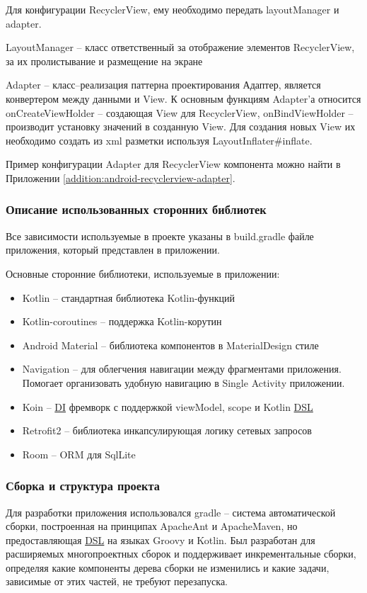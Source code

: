 Для конфигурации RecyclerView, ему необходимо передать layoutManager и adapter.

LayoutManager – класс ответственный за отображение элементов RecyclerView, за их пролистывание и размещение на экране

Adapter – класс–реализация паттерна проектирования Адаптер, является конвертером между данными и View.
К основным функциям Adapter’а относится onCreateViewHolder – создающая View для RecyclerView, onBindViewHolder – производит установку значений в созданную View.
Для создания новых View их необходимо создать из xml разметки используя LayoutInflater\#inflate.

Пример конфигурации Adapter для RecyclerView компонента можно найти в Приложении \ref{addition:android-recyclerview-adapter}.

\subsubsection{Описание использованных сторонних библиотек}\indent
Все зависимости используемые в проекте указаны в build.gradle файле приложения, который представлен в приложении.

Основные сторонние библиотеки, используемые в приложении:


\begin{itemize}
    \item Kotlin – стандартная библиотека Kotlin-функций
    \item Kotlin-coroutines – поддержка Kotlin-корутин
    \item Android Material – библиотека компонентов в MaterialDesign стиле
    \item Navigation – для облегчения навигации между фрагментами приложения. Помогает организовать удобную навигацию в Single Activity приложении.
    \item Koin – \hyperlink{gloss:di}{DI} фремворк с поддержкой viewModel, scope и Kotlin \hyperlink{gloss:dsl}{DSL}
    \item Retrofit2 – библиотека инкапсулирующая логику сетевых запросов
    \item Room – ORM для SqlLite
\end{itemize}

\subsubsection{Сборка и структура проекта}\indent
Для разработки приложения использовался gradle – система автоматической сборки, построенная на принципах ApacheAnt и ApacheMaven, но предоставляющая \hyperlink{gloss:dsl}{DSL} на языках Groovy и Kotlin.
Был разработан для расширяемых многопроектных сборок и поддерживает инкрементальные сборки, определяя какие компоненты дерева сборки не изменились и какие задачи, зависимые от этих частей, не требуют перезапуска.

